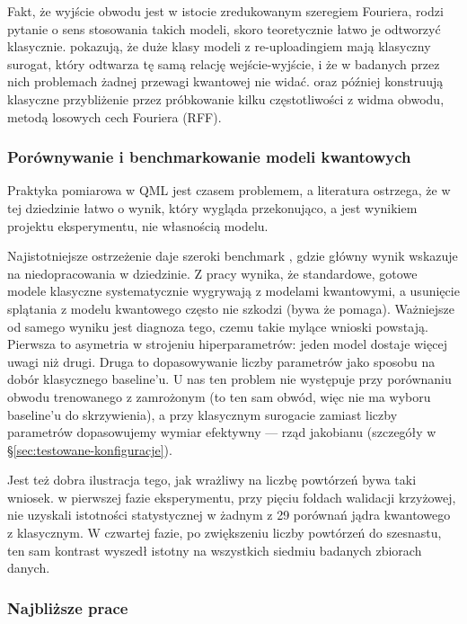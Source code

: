 \documentclass[11pt, a4paper]{article}
\begin{document}
Fakt, że wyjście obwodu jest w istocie zredukowanym szeregiem Fouriera, rodzi pytanie o sens stosowania takich modeli, skoro teoretycznie łatwo je odtworzyć klasycznie. \citet{schreiber2023} pokazują, że duże klasy modeli z re-uploadingiem mają klasyczny surogat, który odtwarza tę samą relację wejście-wyjście, i że w badanych przez nich problemach żadnej przewagi kwantowej nie widać. \citet{landman2022} oraz później \citet{sweke2025} konstruują klasyczne przybliżenie przez próbkowanie kilku częstotliwości z widma obwodu, metodą losowych cech Fouriera (RFF).
\subsubsection{Porównywanie i benchmarkowanie modeli kwantowych}

Praktyka pomiarowa w QML jest czasem problemem, a literatura ostrzega, że w tej dziedzinie łatwo o wynik, który wygląda przekonująco, a jest wynikiem projektu eksperymentu, nie własnością modelu.

Najistotniejsze ostrzeżenie daje szeroki benchmark \citep{bowles2024}, gdzie główny wynik wskazuje na niedopracowania w dziedzinie. Z pracy wynika, że standardowe, gotowe modele klasyczne systematycznie wygrywają z modelami kwantowymi, a usunięcie splątania z modelu kwantowego często nie szkodzi (bywa że pomaga). Ważniejsze od samego wyniku jest diagnoza tego, czemu takie mylące wnioski powstają. Pierwsza to asymetria w strojeniu hiperparametrów: jeden model dostaje więcej uwagi niż drugi. Druga to dopasowywanie liczby parametrów jako sposobu na dobór klasycznego baseline'u. U nas ten problem nie występuje przy porównaniu obwodu trenowanego z zamrożonym (to ten sam obwód, więc nie ma wyboru baseline'u do skrzywienia), a przy klasycznym surogacie zamiast liczby parametrów dopasowujemy wymiar efektywny — rząd jakobianu (szczegóły w \S\ref{sec:testowane-konfiguracje}).

Jest też dobra ilustracja tego, jak wrażliwy na liczbę powtórzeń bywa taki wniosek. \citet{kakavand2026} w pierwszej fazie eksperymentu, przy pięciu foldach walidacji krzyżowej, nie uzyskali istotności statystycznej w żadnym z 29 porównań jądra kwantowego z klasycznym. W czwartej fazie, po zwiększeniu liczby powtórzeń do szesnastu, ten sam kontrast wyszedł istotny na wszystkich siedmiu badanych zbiorach danych.

\subsubsection{Najbliższe prace}
\end{document}
